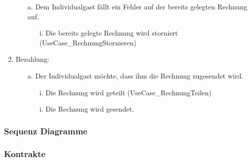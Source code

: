\documentclass[./detailed_overview_usecases.tex]{subfiles}
\begin{document}
\begin{enumerate}
        \begin{itemize}
            \item[a.] Dem Individualgast fällt ein Fehler auf der bereits gelegten Rechnung auf.
            \begin{itemize}
                \item[i.] Die bereits gelegte Rechnung wird storniert (UseCase_RechnungStornieren)
            \end{itemize}
        \end{itemize}
        \setcounter{enumi}{5}
        \item Bezahlung: \begin{itemize}
                             \item[a.] Der Individualgast möchte, dass ihm die Rechnung zugesendet wird.
                             \begin{itemize}
                                 \item[i.] Die Rechnung wird geteilt (UseCase_RechnungTeilen)
                                 \item[i.] Die Rechnung wird gesendet.
                             \end{itemize}
        \end{itemize}
    \end{enumerate}

    \subsubsection{Sequenz Diagramme}
    \subsubsection{Kontrakte}
\end{document}
